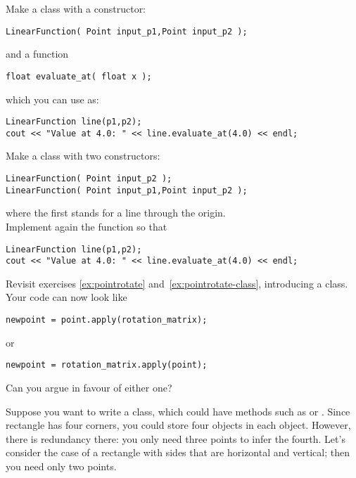 \prerequisite{\ref{sec:hasa}}

\begin{exercise}
  \label{ex:geom:line}
  Make a class  with a constructor:
\begin{verbatim}
LinearFunction( Point input_p1,Point input_p2 );
\end{verbatim}
  and a function
\begin{verbatim}
float evaluate_at( float x );
\end{verbatim}
  which you can use as:
\begin{verbatim}
LinearFunction line(p1,p2);
cout << "Value at 4.0: " << line.evaluate_at(4.0) << endl;
\end{verbatim}
\end{exercise}

\begin{exercise}
  \label{ex:geom:line2}
  Make a class  with two constructors:
\begin{verbatim}
LinearFunction( Point input_p2 );
LinearFunction( Point input_p1,Point input_p2 );
\end{verbatim}
where the first stands for a line through the origin.\\
Implement again the  function so that
\begin{verbatim}
LinearFunction line(p1,p2);
cout << "Value at 4.0: " << line.evaluate_at(4.0) << endl;
\end{verbatim}
\end{exercise}

\begin{exercise}
  \label{ex:pointrotate-matrix}
  Revisit exercises \ref{ex:pointrotate}
  and~\ref{ex:pointrotate-class}, introducing a  class. Your
  code can now look like
\begin{verbatim}
newpoint = point.apply(rotation_matrix);
\end{verbatim}
  or
\begin{verbatim}
newpoint = rotation_matrix.apply(point);
\end{verbatim}
  Can you argue in favour of either one?
\end{exercise}

Suppose you want to write a  class, which could have methods such as
 or .
Since rectangle has four corners, you could store four 
objects in each  object. However, there is redundancy
there: you only need three points to infer the fourth. Let's consider
the case of a rectangle with sides that are horizontal and vertical;
then you need only two points.

